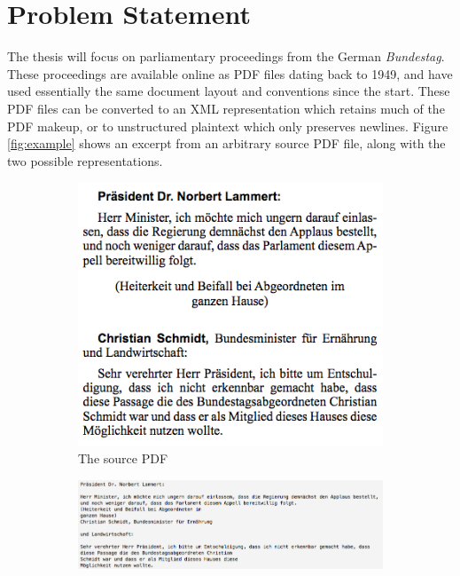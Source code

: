 \section*{Problem Statement}
The thesis will focus on parliamentary proceedings from the German
\emph{Bundestag}. These proceedings are available online as PDF files dating
back to 1949, and have used essentially the same document layout and conventions
since the start. These PDF files can be converted to an XML representation which
retains much of the PDF makeup, or to unstructured plaintext which only
preserves newlines. Figure \ref{fig:example} shows an excerpt from an arbitrary
source PDF file, along with the two possible representations.

\begin{figure}[htbp]
  \centering
  \begin{subfigure}[b]{0.4\textwidth} 
    \centering
    \includegraphics[width=\textwidth]{source.png}
    \caption{The source PDF}
  \end{subfigure}
  \begin{subfigure}[b]{0.59\textwidth}
	\centering
    \includegraphics[width=\textwidth]{plain.png}

\end{subfigure}
\end{figure}
